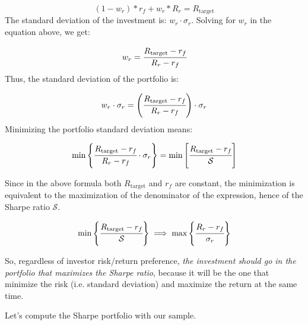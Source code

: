 \begin{equation*} 
(1 - w_r) * r_f + w_r * R_r =R_\textrm{target} 
\end{equation*}
\noindent
The standard deviation of the investment is: \(w_r\cdot \sigma_r\). Solving for \(w_r\) in the equation above, we get:

\begin{equation*} 
	w_r = \cfrac{R_\textrm{target} - r_f}{R_r - r_f} 
\end{equation*}
Thus, the standard deviation of the portfolio is:

\begin{equation*} 
w_r\cdot \sigma_r = \left(\cfrac{R_\textrm{target} - r_f}{R_r - r_f}\right)\cdot \sigma_r 
\end{equation*}
Minimizing the portfolio standard deviation means:

\begin{equation} 
\textrm{min}\left\{\cfrac{R_\textrm{target} - r_f}{R_r - r_f}\cdot \sigma_r\right\} = \textrm{min}\left[\cfrac{R_\textrm{target} - r_f}{\mathcal{S}}\right]
\end{equation}

Since in the above formula both $R_{\textrm{target}}$ and $r_f$ are constant, the minimization is equivalent to the maximization of the denominator of the expression, hence of the Sharpe ratio $\mathcal{S}$.

\begin{equation} 
\textrm{min}\left\{\cfrac{R_\textrm{target} - r_f}{\mathcal{S}}\right\}
\implies\textrm{max}\left\{\cfrac{R_r - r_f}{\sigma_r}\right\}
\end{equation}

So, regardless of investor risk/return preference, \emph{the investment should go in the portfolio that maximizes the Sharpe ratio}, because it will be the one that minimize the risk (i.e. standard deviation) and maximize the return at the same time.

Let's compute the Sharpe portfolio with our sample.

